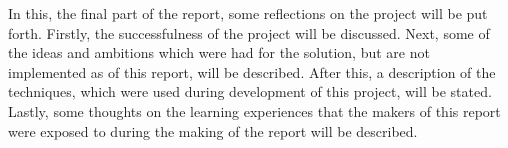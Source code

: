 In this, the final part of the report, some reflections on the project will be put forth. 
Firstly, the successfulness of the project will be discussed. 
Next, some of the ideas and ambitions which were had for the solution, but are not implemented as of this report, will be described.
After this, a description of the techniques, which were used during development of this project, will be stated.
Lastly, some thoughts on the learning experiences that the makers of this report were exposed to during the making of the report will be described.